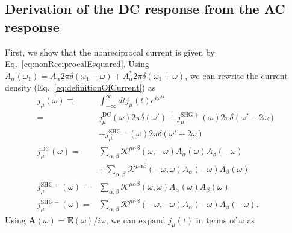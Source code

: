 \documentclass[twocolumn,superscriptaddress]{revtex4-1}
\newcommand{\uprm}[1]{^{\mathrm{#1}}}
\begin{document}
\subsection{Derivation of the DC response from the AC response}
First, we show that the nonreciprocal current is given by Eq.~\eqref{eq:nonReciprocalEsquared}.
Using $A_\alpha(\omega_1)=A_\alpha 2\pi\delta(\omega_1-\omega) +A_\alpha^* 2\pi\delta(\omega_1+\omega)$, we can rewrite the current density (Eq.~\eqref{eq:definitionOfCurrent}) as
\begin{align}
  j_\mu(\omega)\equiv &\int_{-\infty}^{\infty}dt j_\mu(t) e^{i\omega' t}\nonumber\\
  =& j_\mu\uprm{DC}(\omega)2\pi \delta(\omega')+j_\mu\uprm{SHG+}(\omega)2\pi\delta(\omega'-2\omega)\nonumber \\
  &+j_\mu\uprm{SHG-}(\omega)2\pi\delta(\omega'+2\omega)\nonumber \\
  j_\mu\uprm{DC}(\omega)=&\sum_{\alpha,\beta}\mathcal{K}^{\mu\alpha\beta}(\omega,-\omega) A_\alpha(\omega) A_\beta(-\omega)\nonumber\\
  &+\sum_{\alpha,\beta}\mathcal{K}^{\mu\alpha\beta}(-\omega,\omega) A_\alpha(-\omega) A_\beta(\omega) 
   \label{eq:DCsumOfalpha_beta}\\
  j_\mu\uprm{SHG+}(\omega)=&\sum_{\alpha,\beta}\mathcal{K}^{\mu\alpha\beta}(\omega,\omega) A_\alpha(\omega) A_\beta(\omega)\\
  j_\mu\uprm{SHG-}(\omega)=&\sum_{\alpha,\beta}\mathcal{K}^{\mu\alpha\beta}(-\omega,-\omega) A_\alpha(-\omega) A_\beta(-\omega).
\end{align}
Using $\bm{A}(\omega)=\bm{E}(\omega)/i\omega$, we can expand $j_\mu(t)$ in terms of $\omega$ as
\end{document}
